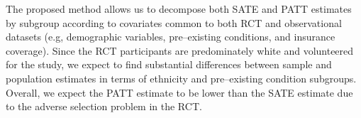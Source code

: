 \documentclass[12pt]{article}
\newcommand{\todo}[1]{{\color{red}{TO DO: \sc #1}}}
\begin{document}
\todo{Update to reflect what we expected + what we actually saw}
The proposed method allows us to decompose both SATE and PATT estimates by subgroup according to covariates common to both RCT and observational datasets (e.g, demographic variables, pre--existing conditions, and insurance coverage). Since the RCT participants are predominately white and volunteered for the study, we expect to find substantial differences between sample and population estimates in terms of ethnicity and pre--existing condition subgroups. Overall, we expect the PATT estimate to be lower than the SATE estimate due to the adverse selection problem in the RCT. \\




\pagebreak

\begin{singlespace}		%




\pagebreak
\begin{appendices}

\end{appendices}
\end{singlespace}

\itemize
\end{document}
